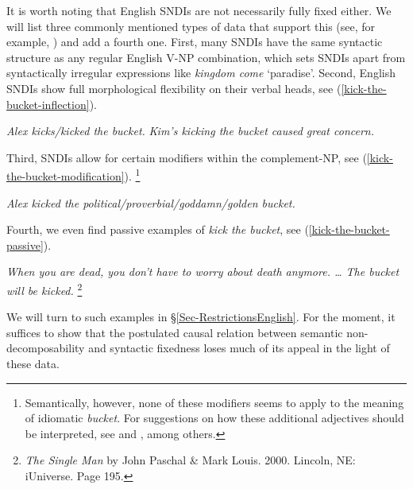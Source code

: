 \documentclass[output=paper]{langsci/langscibook}
\begin{document}
\largerpage
It is worth noting that English SNDIs are not necessarily fully fixed either. We will list three commonly mentioned types of data that support this (see, for example, \citealt{Baldwin2010}) and add a fourth one.
First, many  SNDIs have the same syntactic structure as any regular English V-NP combination, which sets SNDIs apart from syntactically irregular expressions like \textit{kingdom come} `paradise'. 
Second, English SNDIs show full morphological  flexibility on their verbal heads, see (\ref{kick-the-bucket-inflection}).

\begin{exe}
\ex\label{kick-the-bucket-inflection}
\begin{xlist}
\ex \textit{Alex kicks/kicked the bucket.} \label{kick-the-bucket-inflection-sing}
\ex \textit{Kim's kicking the bucket caused great concern.} \label{kick-the-bucket-inflection-ing}
\end{xlist}
\end{exe}

Third, SNDIs allow for certain modifiers within the complement-NP, see (\ref{kick-the-bucket-modification}).%
\footnote{Semantically, however, none of these modifiers seems to apply to the meaning of idiomatic \textit{bucket}. For suggestions on how these additional adjectives should be interpreted, see \cite{Ernst:81} and \cite{Potts:05}, among others.}

\begin{exe}
\ex\label{kick-the-bucket-modification}\textit{Alex kicked the political/proverbial/goddamn/golden bucket.}
\end{exe}

Fourth, we even find  passive examples of \textit{kick the bucket}, see (\ref{kick-the-bucket-passive}).

\begin{exe}
\ex\label{kick-the-bucket-passive}\textit{When you are dead, you don't have to worry about death anymore. {\ldots} The bucket will be kicked.}%
\footnote{\textit{The Single Man} by John Paschal \& Mark Louis. 2000. Lincoln, NE: iUniverse. Page 195.}
\end{exe}

We will turn to such examples in §\ref{Sec-RestrictionsEnglish}. For the moment, it suffices to show that the postulated causal relation between  semantic non-decomposability and 
syntactic fixedness 
loses much of its appeal in the light of these data.
\end{document}
